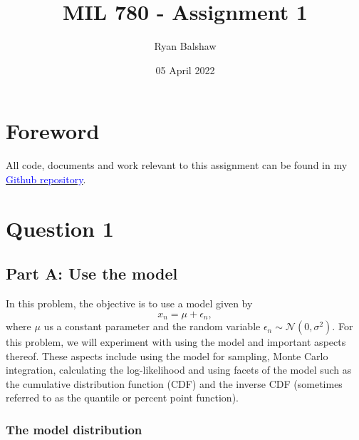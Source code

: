\documentclass{article}
\title{MIL 780 - Assignment 1}
\author{Ryan Balshaw}
\date{05 April 2022}
\begin{document}
\maketitle

\section*{Foreword}
All code, documents and work relevant to this assignment can be found in my \href{https://github.com/RyanBalshaw/MIL_780_assignments}{\textcolor{blue}{Github repository}}.

\section{Question 1}

\subsection{Part A: Use the model}
In this problem, the objective is to use a model given by
\begin{equation}\label{eq:Model1}
x_n = \mu + \epsilon_n,
\end{equation}
where $\mu$ us a constant parameter and the random variable $\epsilon_n \sim \mathcal{N}(0, \sigma^2)$. For this problem, we will experiment with using the model and important aspects thereof. These aspects include using the model for sampling, Monte Carlo integration, calculating the log-likelihood and using facets of the model such as the cumulative distribution function (CDF) and the inverse CDF (sometimes referred to as the quantile or percent point function).

\subsubsection{The model distribution}
\end{document}
